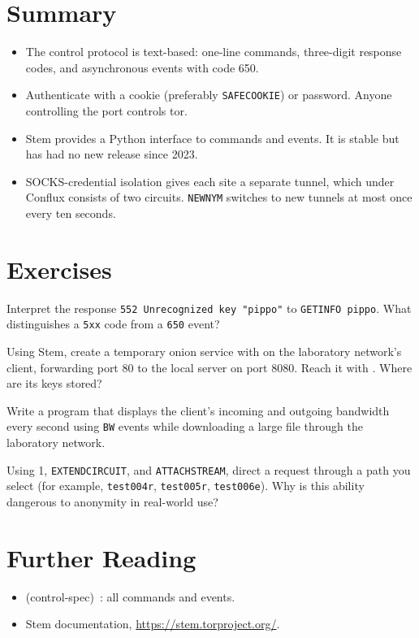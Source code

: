 \section*{Summary}
\begin{itemize}
  \item The control protocol is text-based: one-line commands, three-digit response codes, and asynchronous events with code 650.
  \item Authenticate with a cookie (preferably \texttt{SAFECOOKIE}) or password. Anyone controlling the port controls tor.
  \item Stem provides a Python interface to commands and events. It is stable but has had no new release since 2023.
  \item SOCKS-credential isolation gives each site a separate tunnel, which under Conflux consists of two circuits. \texttt{NEWNYM} switches to new tunnels at most once every ten seconds.
\end{itemize}

\section*{Exercises}

\begin{esercizio}[1]\label{es:18-codici}
Interpret the response \texttt{552 Unrecognized key "pippo"} to \texttt{GETINFO pippo}. What distinguishes a \texttt{5xx} code from a \texttt{650} event?
\end{esercizio}

\begin{esercizio}[2]\label{es:18-onion}
Using Stem, create a temporary onion service with  on the laboratory network's client, forwarding port 80 to the local server on port 8080. Reach it with . Where are its keys stored?
\end{esercizio}

\begin{esercizio}[2]\label{es:18-banda}
Write a program that displays the client's incoming and outgoing bandwidth every second using \texttt{BW} events while downloading a large file through the laboratory network.
\end{esercizio}

\begin{esercizio}[3]\label{es:18-percorso}
Using  1, \texttt{EXTENDCIRCUIT}, and \texttt{ATTACHSTREAM}, direct a request through a path you select (for example, \texttt{test004r}, \texttt{test005r}, \texttt{test006e}). Why is this ability dangerous to anonymity in real-world use?
\end{esercizio}

\section*{Further Reading}
\begin{itemize}
  \item {} (control-spec)~\cite{torspec}: all commands and events.
  \item Stem documentation, \url{https://stem.torproject.org/}.
\end{itemize}
